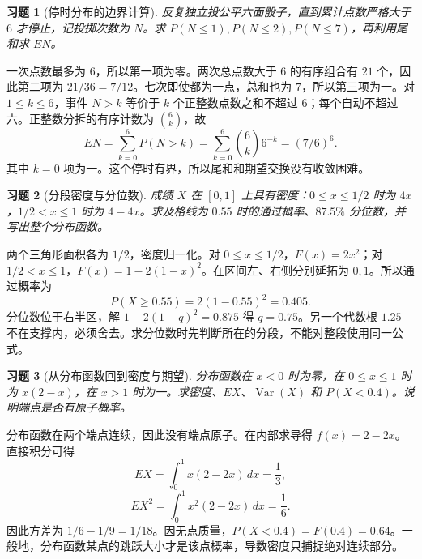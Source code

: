 \documentclass[12pt,fontset=fandol]{ctexart}
\newtheorem{exercise}{习题}[section]
\begin{document}
\begin{exercise}[停时分布的边界计算]\label{q:M-PF-19}
反复独立投公平六面骰子，直到累计点数严格大于 $6$ 才停止，记投掷次数为 $N$。求 $P(N\le1),P(N\le2),P(N\le7)$，再利用尾和求 $EN$。\par{}
\end{exercise}

\begin{solve}\label{a:M-PF-19}一次点数最多为 $6$，所以第一项为零。两次总点数大于 $6$ 的有序组合有 $21$ 个，因此第二项为 $21/36=7/12$。七次即使都为一点，总和也为 $7$，所以第三项为一。对 $1\le k\le6$，事件 $N>k$ 等价于 $k$ 个正整数点数之和不超过 $6$；每个自动不超过六。正整数分拆的有序计数为 $\binom6k$，故\[EN=\sum_{k=0}^6P(N>k)=\sum_{k=0}^6\binom6k6^{-k}=(7/6)^6.\]其中 $k=0$ 项为一。这个停时有界，所以尾和和期望交换没有收敛困难。\end{solve}

\begin{exercise}[分段密度与分位数]\label{q:M-PF-20}
成绩 $X$ 在 $[0,1]$ 上具有密度：$0\le x\le1/2$ 时为 $4x$，$1/2<x\le1$ 时为 $4-4x$。求及格线为 $0.55$ 时的通过概率、$87.5\%$ 分位数，并写出整个分布函数。\par{}
\end{exercise}

\begin{solve}\label{a:M-PF-20}两个三角形面积各为 $1/2$，密度归一化。对 $0\le x\le1/2$，$F(x)=2x^2$；对 $1/2<x\le1$，$F(x)=1-2(1-x)^2$。在区间左、右侧分别延拓为 $0,1$。所以通过概率为\[P(X\ge0.55)=2(1-0.55)^2=0.405.\]分位数位于右半区，解 $1-2(1-q)^2=0.875$ 得 $q=0.75$。另一个代数根 $1.25$ 不在支撑内，必须舍去。求分位数时先判断所在的分段，不能对整段使用同一公式。\end{solve}

\begin{exercise}[从分布函数回到密度与期望]\label{q:M-PF-21}
分布函数在 $x<0$ 时为零，在 $0\le x\le1$ 时为 $x(2-x)$，在 $x>1$ 时为一。求密度、$EX$、$\operatorname{Var}(X)$ 和 $P(X<0.4)$。说明端点是否有原子概率。\par{}
\end{exercise}

\begin{solve}\label{a:M-PF-21}分布函数在两个端点连续，因此没有端点原子。在内部求导得 $f(x)=2-2x$。直接积分可得\[EX=\int_0^1x(2-2x)\,dx=\frac13,\]\[EX^2=\int_0^1x^2(2-2x)\,dx=\frac16.\]因此方差为 $1/6-1/9=1/18$。因无点质量，$P(X<0.4)=F(0.4)=0.64$。一般地，分布函数某点的跳跃大小才是该点概率，导数密度只捕捉绝对连续部分。\end{solve}
\end{document}
